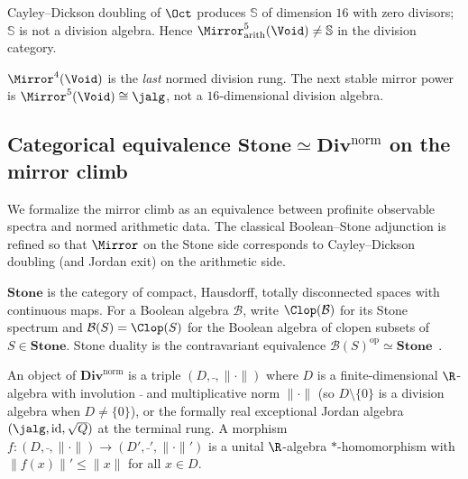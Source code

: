 \begin{lemma}\label{lem:void-mirror:sedenion}
Cayley--Dickson doubling of $\Oct$ produces $\mathbb{S}$ of dimension $16$ with
zero divisors; $\mathbb{S}$ is not a division algebra. Hence
$\Mirror^5_{\mathrm{arith}}(\Void)\neq\mathbb{S}$ in the division category.
\end{lemma}

\begin{corollary}[Hurwitz terminal at $n=4$]\label{cor:void-mirror:hurwitz}
$\Mirror^4(\Void)$ is the \emph{last} normed division rung. The next stable
mirror power is $\Mirror^5(\Void)\cong\jalg$, not a $16$-dimensional division
algebra.
\end{corollary}

\subsection{Categorical equivalence $\mathbf{Stone}\simeq\mathbf{Div}^{\mathrm{norm}}$ on the mirror climb}
\label{sec:void-mirror:equiv}

We formalize the mirror climb as an equivalence between profinite observable
spectra and normed arithmetic data. The classical Boolean--Stone adjunction is
refined so that $\Mirror$ on the Stone side corresponds to Cayley--Dickson
doubling (and Jordan exit) on the arithmetic side.

\begin{definition}\label{def:void-mirror:Stone}
$\mathbf{Stone}$ is the category of compact, Hausdorff, totally disconnected
spaces with continuous maps. For a Boolean algebra $\mathcal{B}$, write
$\Clop(\mathcal{B})$ for its Stone spectrum and
$\mathcal{B}(S)=\Clop(S)$ for the Boolean algebra of clopen subsets of
$S\in\mathbf{Stone}$. Stone duality is the contravariant equivalence
$\mathcal{B}(S)^{\mathrm{op}}\simeq\mathbf{Stone}$~\cite{Stone1936}.
\end{definition}

\begin{definition}\label{def:void-mirror:Divnorm}
An object of $\mathbf{Div}^{\mathrm{norm}}$ is a triple $(D,\bar{\ },\|\cdot\|)$
where $D$ is a finite-dimensional $\R$-algebra with involution $\bar{\ }$ and
multiplicative norm $\|\cdot\|$ (so $D\setminus\{0\}$ is a division algebra when
$D\neq\{0\}$), or the formally real exceptional Jordan algebra
$(\jalg,\mathrm{id},\sqrt{Q})$ at the terminal rung. A morphism
$f:(D,\bar{\ },\|\cdot\|)\to(D',\bar{\ }',\|\cdot\|')$ is a unital
$\R$-algebra $*$-homomorphism with $\|f(x)\|'\leq\|x\|$ for all $x\in D$.
\end{definition}

